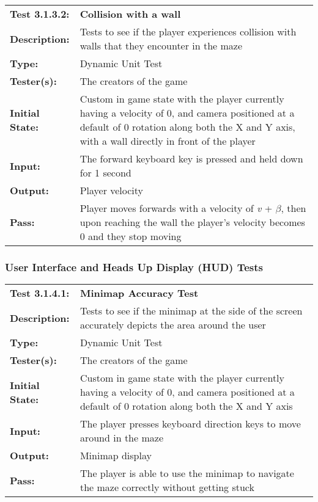 \documentclass[12pt, titlepage]{article}
\begin{document}
\begin{mdframed}[linewidth=1pt]
\begin{tabularx}{\textwidth}{@{}p{3cm}X@{}}
{\bf Test 3.1.3.2:} & {\bf Collision with a wall}\\[\baselineskip]
{\bf Description:} & Tests to see if the player experiences collision with walls that they encounter in the maze\\[0.5\baselineskip]
{\bf Type:} & Dynamic Unit Test\\[0.5\baselineskip]
{\bf Tester(s):} & The creators of the game\\[0.5\baselineskip]
{\bf Initial State:} & Custom in game state with the player currently having a velocity of 0, and camera positioned at a default of 0 rotation along both the X and Y axis, with a wall directly in front of the player\\[0.5\baselineskip]
{\bf Input:} & The forward keyboard key is pressed and held down for 1 second \\[0.5\baselineskip]
{\bf Output:} & Player velocity\\[0.5\baselineskip]
{\bf Pass:} & Player moves forwards with a velocity of \textit{v} + $\beta$, then upon reaching the wall the player's velocity becomes 0 and they stop moving
\end{tabularx}
\end{mdframed}

\subsubsection{User Interface and Heads Up Display (HUD) Tests}
\begin{mdframed}[linewidth=1pt]
\begin{tabularx}{\textwidth}{@{}p{3cm}X@{}}
{\bf Test 3.1.4.1:} & {\bf Minimap Accuracy Test}\\[\baselineskip]
{\bf Description:} & Tests to see if the minimap at the side of the screen accurately depicts the area around the user\\[0.5\baselineskip]
{\bf Type:} & Dynamic Unit Test\\[0.5\baselineskip]
{\bf Tester(s):} & The creators of the game\\[0.5\baselineskip]
{\bf Initial State:} & Custom in game state with the player currently having a velocity of 0, and camera positioned at a default of 0 rotation along both the X and Y axis\\[0.5\baselineskip]
{\bf Input:} & The player presses keyboard direction keys to move around in the maze\\[0.5\baselineskip]
{\bf Output:} & Minimap display\\[0.5\baselineskip]
{\bf Pass:} & The player is able to use the minimap to navigate the maze correctly without getting stuck
\end{tabularx}
\end{mdframed}
\end{document}
